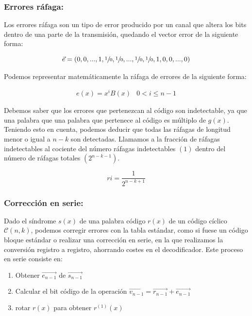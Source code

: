 \documentclass{article}
\begin{document}
\subsubsection{Errores ráfaga:}

Los errores ráfaga son un tipo de error producido por un canal que altera los bits dentro de una parte de la transmisión, quedando el vector error de la siguiente forma:

\begin{equation}
    \vec{e} = (0, 0, ..., 1, \sfrac{1}{0}, \sfrac{1}{0}, ..., \sfrac{1}{0}, \sfrac{1}{0}, 1, 0, 0, ..., 0)
\end{equation}

Podemos representar matemáticamente la ráfaga de errores de la siguiente forma:

\begin{equation}
    \begin{array}{cc}
        e(x) = x^iB(x) & 0 < i \leq n-1
    \end{array}
\end{equation}

Debemos saber que los errores que pertenezcan al código son indetectable, ya que una palabra que una palabra que pertenece al código es múltiplo de $g(x)$. Teniendo esto en cuenta, podemos deducir que todas las ráfagas de longitud menor o igual a $n-k$ son detectadas. Llamamos a la fracción de ráfagas indetectables al cociente del número ráfagas indetectables $(1)$ dentro del número de ráfagas totales $(2^{n-k-1})$.

\begin{equation}
    ri = \frac{1}{2^{n-k+1}}
\end{equation}

\subsubsection{Corrección en serie:}

Dado el síndrome $s(x)$ de una palabra código $r(x)$ de un código cíclico $\mathcal{C}(n,k)$, podemos corregir errores con la tabla estándar, como si fuese un código bloque estándar o realizar una corrección en serie, en la que realizamos la conversión registro a registro, ahorrando costes en el decodificador. Este proceso en serie consiste en:

\begin{enumerate}
    \item Obtener $\vec{e_{n-1}}$ de $\vec{s_{n-1}}$
    \item Calcular el bit código de la operación $\vec{v_{n-1}} = \vec{r_{n-1}} + \vec{e_{n-1}}$
    \item rotar $r(x)$ para obtener $r^{(1)}(x)$
\end{enumerate}
\end{document}
